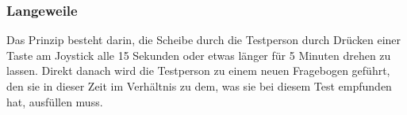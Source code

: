 \subsubsection{Langeweile} \label{langeweile-4}





Das Prinzip besteht darin, die Scheibe durch die Testperson durch Drücken einer Taste am Joystick alle 15 Sekunden oder etwas länger für 5 Minuten drehen zu lassen. Direkt danach wird die Testperson zu einem neuen Fragebogen geführt, den sie in dieser Zeit im Verhältnis zu dem, was sie bei diesem Test empfunden hat, ausfüllen muss.